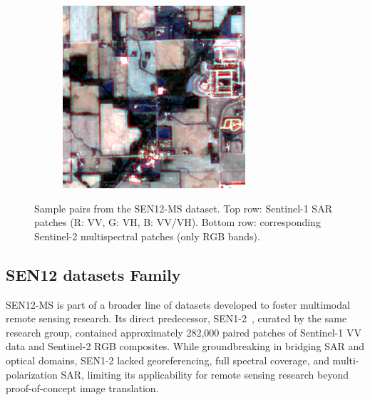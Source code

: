 \begin{figure}[!htbp]
\begin{subfigure}{0.18\textwidth}
    \end{subfigure}
    \begin{subfigure}{0.18\textwidth}
        \includegraphics[width=\linewidth]{img/ROIs1970_fall_s2_145_p100.png}
    \end{subfigure}

    \caption[Sample SAR–optical pairs from SEN12-MS]{Sample pairs from the SEN12-MS dataset. Top row: Sentinel-1 SAR patches (R: VV, G: VH, B: VV/VH). Bottom row: corresponding Sentinel-2 multispectral patches (only RGB bands).}
    \label{fig:sen12ms_pairs}
\end{figure}



\subsection{SEN12 datasets Family}
SEN12-MS is part of a broader line of datasets developed to foster multimodal remote sensing research. Its direct predecessor, SEN1-2~\cite{sen12_2018}, curated by the same research group, contained approximately 282,000 paired patches of Sentinel-1 VV data and Sentinel-2 RGB composites. While groundbreaking in bridging SAR and optical domains, SEN1-2 lacked georeferencing, full spectral coverage, and multi-polarization SAR, limiting its applicability for remote sensing research beyond proof-of-concept image translation.

